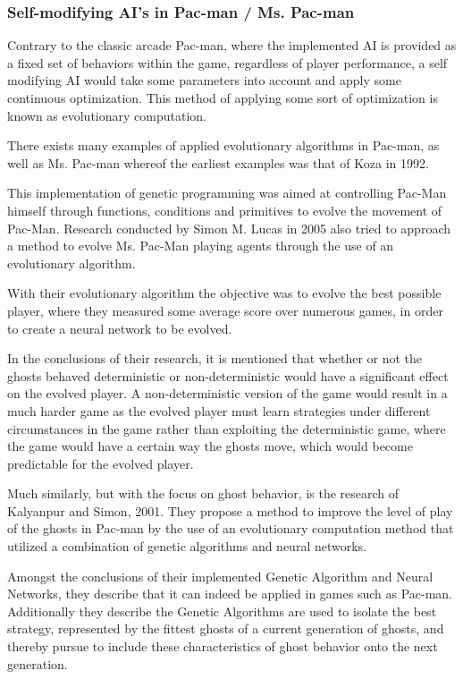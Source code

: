 \subsubsection{Self-modifying AI's in Pac-man / Ms. Pac-man}

Contrary to the classic arcade Pac-man, where the implemented AI is provided as a fixed set of behaviors within the game, regardless of player performance, a self modifying AI would take some parameters into account and apply some continuous optimization. This method of applying some sort of optimization is known as evolutionary computation.


There exists many examples of applied evolutionary algorithms in Pac-man, as well as Ms. Pac-man whereof the earliest examples was that of Koza in 1992.\cite{Koza1992}

This implementation of genetic programming was aimed at controlling Pac-Man himself through functions, conditions and primitives to evolve the movement of Pac-Man. \cite[pp. 2]{Lucas2005}
Research conducted by Simon M. Lucas in 2005 also tried to approach a method to evolve Ms. Pac-Man playing agents through the use of an evolutionary algorithm. \cite{Lucas2005}

With their evolutionary algorithm the objective was to evolve the best possible player, where they measured some average score over numerous games, in order to create a neural network to be evolved. \cite[pp. 8]{Lucas2005}

In the conclusions of their research, it is mentioned that whether or not the ghosts behaved deterministic or non-deterministic would have a significant effect on the evolved player. A non-deterministic version of the game would result in a much harder game  as the evolved player must learn strategies under different circumstances in the game rather than exploiting the deterministic game, where the game would have a certain way the ghosts move, which would become predictable for the evolved player.\cite[pp. 8]{Lucas2005}

Much similarly, but with the focus on ghost behavior, is the research of Kalyanpur and Simon, 2001. They propose a method to improve the level of play of the ghosts in Pac-man by the use of an evolutionary computation method that utilized a combination of genetic algorithms and neural networks. \cite{Kalyanpur2001}

Amongst the conclusions of their implemented Genetic Algorithm and Neural Networks, they describe that it can indeed be applied in games such as Pac-man. Additionally they describe the Genetic Algorithms are used to isolate the best strategy, represented by the fittest ghosts of a current generation of ghosts, and thereby pursue to include these characteristics of ghost behavior onto the next generation. \cite[pp. 8]{Kalyanpur2001}

